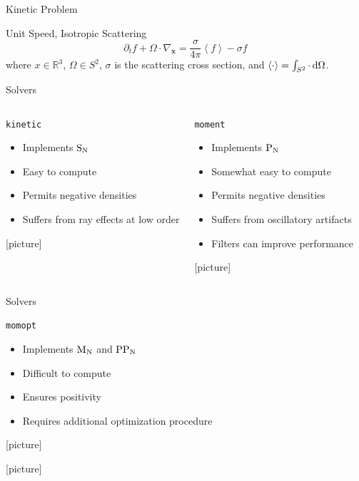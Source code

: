\documentclass{beamer}
\renewcommand{\vec}[1]{\ensuremath{\mathbf{#1}}}
\newcommand{\integral}[1]{\ensuremath{\left\langle #1 \right\rangle}}
\newcommand{\R}{\ensuremath{\mathbb{R}}\xspace}
\newcommand{\SN}{\ensuremath{\textnormal{S}_\textnormal{N}}\xspace}
\newcommand{\PN}{\ensuremath{\textnormal{P}_\textnormal{N}}\xspace}
\newcommand{\MN}{\ensuremath{\textnormal{M}_\textnormal{N}}\xspace}
\newcommand{\PPN}{\ensuremath{\textnormal{PP}_\textnormal{N}}\xspace}
\newcommand{\kinetic}{\texttt{kinetic}\xspace}
\newcommand{\moment}{\texttt{moment}\xspace}
\newcommand{\momopt}{\texttt{momopt}\xspace}
\begin{document}
    \begin{frame}{Kinetic Problem}
        \begin{block}{Unit Speed, Isotropic Scattering}
            \begin{equation*}
                \partial_t f + \Omega \cdot \nabla_\vec{x} = \frac{\sigma}{4\pi} \integral{f} - \sigma f
            \end{equation*}
            where $x \in \R^3$, $\Omega \in S^2$, $\sigma$ is the scattering cross section, and $\integral{\cdot} = \int_{S^2} \cdot \dif \Omega$.
        \end{block}
    \end{frame}

    \begin{frame}{Solvers}
        \begin{columns}
            \begin{block}{\kinetic}
                \begin{itemize}
                    \item Implements \SN
                    \item Easy to compute
                    \item Permits negative densities
                    \item Suffers from ray effects at low order
                \end{itemize}
                [picture]
            \end{block}
            \begin{block}{\moment}
                \begin{itemize}
                    \item Implements \PN
                    \item Somewhat easy to compute
                    \item Permits negative densities
                    \item Suffers from oscillatory artifacts
                    \item Filters can improve performance
                \end{itemize}
                [picture]
            \end{block}
        \end{columns}
    \end{frame}

    \begin{frame}{Solvers}
        \begin{block}{\momopt}
            \begin{itemize}
                \item Implements \MN and \PPN
                \item Difficult to compute
                \item Ensures positivity
                \item Requires additional optimization procedure
            \end{itemize}
            [picture]

            [picture]
        \end{block}
    \end{frame}
\end{document}
